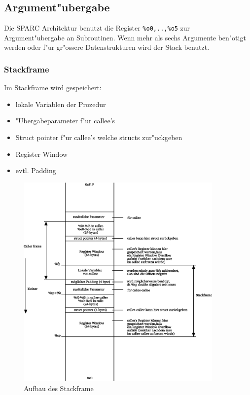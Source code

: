 \documentclass[german, 10pt, a4paper, twocolumn]{scrartcl}
\begin{document}
\subsection{Argument"ubergabe}

Die SPARC Architektur benutzt die Register \verb#%o0,..,%o5# zur Argument"ubergabe an Subroutinen. Wenn mehr als sechs Argumente ben"otigt werden oder f"ur gr"ossere Datenstrukturen wird der Stack benutzt.

\subsubsection{Stackframe}

Im Stackframe wird gespeichert:
\begin{itemize}
	\item lokale Variablen der Prozedur
	\item "Ubergabeparameter f"ur callee's
	\item Struct pointer f"ur callee's welche structs zur"uckgeben
	\item Register Window
	\item evtl. Padding
\end{itemize}

\onecolumn

\begin{figure}[hbt]
 \begin{center}
 	\includegraphics[width=0.9\textwidth]{stackframe.eps}
 \end{center}
 \label{stackframe}
 \caption{Aufbau des Stackframe}
\end{figure}
\end{document}
